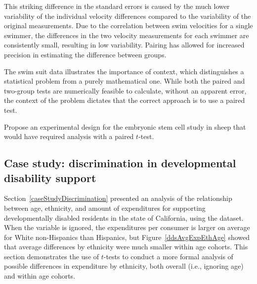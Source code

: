 This striking difference in the standard errors is caused by the much lower variability of the individual velocity differences compared to the variability of the original measurements. Due to the correlation between swim velocities for a single swimmer, the differences in the two velocity measurements for each swimmer are consistently small, resulting in low variability. Pairing has allowed for increased precision in estimating the difference between groups.

The swim suit data illustrates the importance of context, which distinguishes a statistical problem from a purely mathematical one. While both the paired and two-group tests are numerically feasible to calculate, without an apparent error, the context of the problem dictates that the correct approach is to use a paired test.

\begin{exercisewrap}
\begin{nexercise}
Propose an experimental design for the embryonic stem cell study in sheep that would have required analysis with a paired $t$-test.\footnotemark{}
\end{nexercise}
\end{exercisewrap}


\textD{\newpage}


\subsection{Case study: discrimination in developmental disability support}


Section~\ref{caseStudyDiscrimination} presented an analysis of the relationship between age, ethnicity, and amount of expenditures for supporting developmentally disabled residents in the state of California, using the  dataset. When the variable  is ignored, the expenditures per consumer is larger on average for White non-Hispanics than Hispanics, but Figure~\ref{ddsAvgExpEthAge} showed that average differences by ethnicity were much smaller within age cohorts. This section demonstrates the use of $t$-tests to conduct a more formal analysis of possible differences in expenditure by ethnicity, both overall (i.e., ignoring age) and within age cohorts. 


